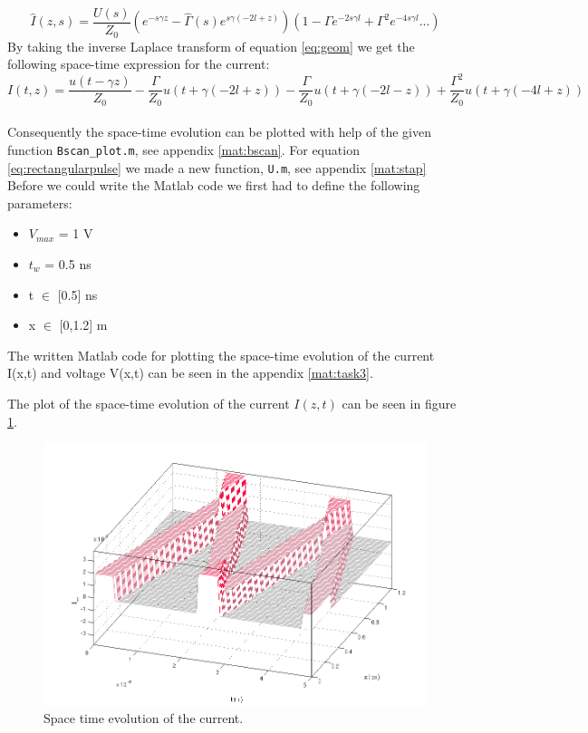\documentclass[final]{scrreprt} %
\begin{document}
\begin{equation} \label{eq:geom}
\hat{I}(z,s)= \frac{U(s)}{Z_{0}}\left(e^{-s\gamma z} - \hat{\Gamma}(s)e^{s\gamma(-2l+z)}\right)\left(1-\Gamma e^{-2s\gamma l}+\Gamma^2 e^{-4s\gamma l}...\right)
\end{equation}
By taking the inverse Laplace transform of equation \ref{eq:geom} we get the following space-time expression for the current:
\begin{equation}
I(t,z)=\frac{u(t-\gamma z)}{Z_{0}}-\frac{\Gamma}{Z_{0}}u(t+\gamma(-2l+z))-\frac{\Gamma}{Z_{0}}u(t+\gamma(-2l-z)) + \frac{\Gamma^2}{Z_{0}}u(t+\gamma(-4l+z))
\end{equation}
\\
Consequently the space-time evolution can be plotted with help of the given function \texttt{Bscan\_plot.m}, see appendix \ref{mat:bscan}. For equation \ref{eq:rectangularpulse} we made a new function, \texttt{U.m}, see appendix \ref{mat:stap}
\\
Before we could write the Matlab code we first had to define the following parameters:
\begin{itemize}
\item $V_{max}$ = 1 V
\item $t_w$ = 0.5 ns
\item t $\in$ [0.5] ns
\item x $\in$ [0,1.2] m
\end{itemize}

The written Matlab code for plotting the space-time evolution of the current I(x,t) and voltage V(x,t) can be seen in the appendix \ref{mat:task3}. 



The plot of the space-time evolution of the current $I(z,t)$ can be seen in figure \ref{fig:iplot}. 
\begin{figure}[H]
\centering
\includegraphics[width=\linewidth]{resources/Iplot.png}
\caption{Space time evolution of the current.}
\label{fig:iplot}
\end{figure}
\end{document}
